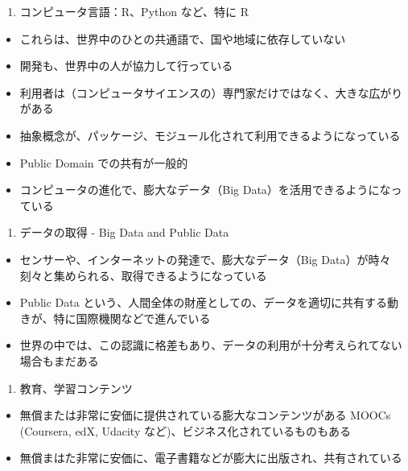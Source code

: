 \documentclass[
]{bxjsbook}
\providecommand{\tightlist}{%
  \setlength{\itemsep}{0pt}\setlength{\parskip}{0pt}}
\theoremstyle{definition}
\theoremstyle{definition}
\theoremstyle{definition}
\theoremstyle{definition}
\theoremstyle{remark}
\begin{document}
\begin{enumerate}
\def\labelenumi{\arabic{enumi}.}
\tightlist
\item
  コンピュータ言語：R、Python など、特に R
\end{enumerate}

\begin{itemize}
\tightlist
\item
  これらは、世界中のひとの共通語で、国や地域に依存していない
\item
  開発も、世界中の人が協力して行っている
\item
  利用者は（コンピュータサイエンスの）専門家だけではなく、大きな広がりがある
\item
  抽象概念が、パッケージ、モジュール化されて利用できるようになっている
\item
  Public Domain での共有が一般的
\item
  コンピュータの進化で、膨大なデータ（Big Data）を活用できるようになっている
\end{itemize}

\begin{enumerate}
\def\labelenumi{\arabic{enumi}.}
\setcounter{enumi}{1}
\tightlist
\item
  データの取得 - Big Data and Public Data
\end{enumerate}

\begin{itemize}
\tightlist
\item
  センサーや、インターネットの発達で、膨大なデータ（Big Data）が時々刻々と集められる、取得できるようになっている
\item
  Public Data という、人間全体の財産としての、データを適切に共有する動きが、特に国際機関などで進んでいる
\item
  世界の中では、この認識に格差もあり、データの利用が十分考えられてない場合もまだある
\end{itemize}

\begin{enumerate}
\def\labelenumi{\arabic{enumi}.}
\setcounter{enumi}{2}
\tightlist
\item
  教育、学習コンテンツ
\end{enumerate}

\begin{itemize}
\tightlist
\item
  無償または非常に安価に提供されている膨大なコンテンツがある MOOCs (Coursera, edX, Udacity など)、ビジネス化されているものもある
\item
  無償まはた非常に安価に、電子書籍などが膨大に出版され、共有されている
\end{itemize}
\end{document}
